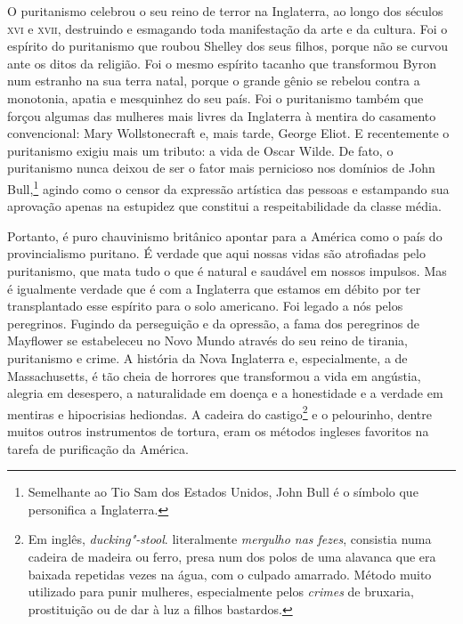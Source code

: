 O puritanismo celebrou o seu reino de terror na Inglaterra, ao longo dos
séculos \textsc{xvi} e \textsc{xvii}, destruindo e esmagando toda manifestação da arte e
da cultura. Foi o espírito do puritanismo que roubou Shelley dos seus
filhos, porque não se curvou ante os ditos da religião. Foi o mesmo
espírito tacanho que transformou Byron num estranho na sua terra natal, porque
o grande gênio se rebelou contra a monotonia, apatia e mesquinhez do seu
país. Foi o puritanismo também que forçou algumas das mulheres mais
livres da Inglaterra à mentira do casamento convencional: Mary Wollstonecraft e,
mais tarde, George Eliot. E recentemente o puritanismo exigiu mais um
tributo: a vida de Oscar Wilde. De fato, o puritanismo nunca deixou de
ser o fator mais pernicioso nos domínios de John Bull,\footnote{Semelhante
  ao Tio Sam dos Estados Unidos, John Bull é o símbolo que personifica a
  Inglaterra.} agindo como o censor da expressão artística das pessoas e
estampando sua aprovação apenas na estupidez que constitui a
respeitabilidade da classe média.

Portanto, é puro chauvinismo britânico apontar para a América como o
país do provincialismo puritano. É verdade que aqui nossas vidas são
atrofiadas pelo puritanismo, que mata tudo o que é natural e saudável em
nossos impulsos. Mas é igualmente verdade que é com a Inglaterra
que estamos em débito por ter transplantado esse espírito para o solo
americano. Foi legado a nós pelos peregrinos. Fugindo da perseguição e
da opressão, a fama dos peregrinos de Mayflower se estabeleceu no Novo
Mundo através do seu reino de tirania, puritanismo e crime. A história
da Nova Inglaterra e, especialmente, a de Massachusetts, é tão cheia de
horrores que transformou a vida em angústia, alegria em desespero, a
naturalidade em doença e a honestidade e a verdade em mentiras e
hipocrisias hediondas. A cadeira do castigo\footnote{Em inglês, \textit{ducking"-stool}. literalmente \textit{mergulho nas fezes}, consistia numa cadeira de madeira ou ferro, presa num dos polos de uma
  alavanca que era baixada repetidas vezes na água, com o culpado
  amarrado. Método muito utilizado para punir mulheres, especialmente
  pelos \textit{crimes} de bruxaria, prostituição ou de dar à luz a filhos
  bastardos.} e o pelourinho, dentre muitos outros instrumentos de
tortura, eram os métodos ingleses favoritos na tarefa de purificação da
América.

